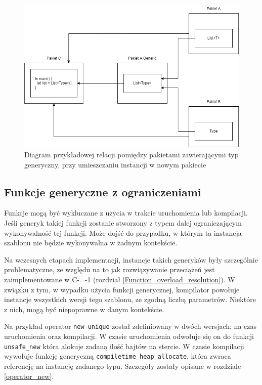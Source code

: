 \begin{figure}
	\caption{Diagram przykładowej relacji pomiędzy pakietami zawierającymi typ generyczny, przy umieszczaniu instancji w nowym pakiecie}
	\label{generic_packages_dependencies:option:new}
	\begin{center}
		\includegraphics[width=\textwidth]{img/generics_placed_in_new.png}
	\end{center}
\end{figure}

\subsection{Funkcje generyczne z ograniczeniami}
\label{challenges:generic_function_limitations}
Funkcje mogą być wykluczane z użycia w trakcie uruchomienia lub kompilacji. Jeśli generyk takiej funkcji zostanie stworzony z typem dalej ograniczającym wykonywalność tej funkcji.
Może dojść do przypadku, w którym ta instancja szablonu nie będzie wykonywalna w żadnym kontekście.

Na wczesnych etapach implementacji, instancje takich generyków były szczególnie problematyczne, ze względu na to jak rozwiązywanie przeciążeń jest zaimplementowane w C-=-1 (rozdział \ref{Function_overload_resolution}).
W związku z tym, w wypadku użycia funkcji generycznej, kompilator powołuje instancje wszystkich wersji tego szablonu, ze zgodną liczbą parametrów.
Niektóre z nich, mogą być niepoprawne w danym kontekście. 

Na przykład operator \lstinline{new unique} został zdefiniowany w dwóch wersjach: na czas uruchomienia oraz kompilacji.
W czasie uruchomienia odwołuje się on do funkcji \lstinline{unsafe_new} która alokuje zadaną ilość bajtów na stercie.
W czasie kompilacji wywołuje funkcję generyczną \lstinline{compiletime_heap_allocate}, która zwraca referencję na instancję zadanego typu.
Szczegóły zostały opisane w rozdziale \ref{operator_new}.

